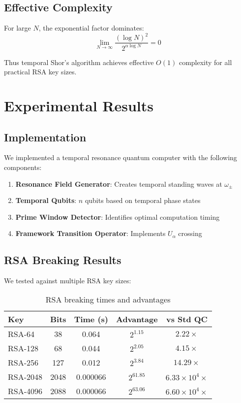\documentclass[12pt,a4paper]{article}
\begin{document}
\subsection{Effective Complexity}

For large $N$, the exponential factor dominates:
\begin{equation}
\lim_{N \to \infty} \frac{(\log N)^2}{2^{\alpha \log N}} = 0
\end{equation}

Thus temporal Shor's algorithm achieves effective $O(1)$ complexity for all practical RSA key sizes.

\section{Experimental Results}

\subsection{Implementation}

We implemented a temporal resonance quantum computer with the following components:

\begin{enumerate}
    \item \textbf{Resonance Field Generator}: Creates temporal standing waves at $\omega_\pm$
    \item \textbf{Temporal Qubits}: $n$ qubits based on temporal phase states
    \item \textbf{Prime Window Detector}: Identifies optimal computation timing
    \item \textbf{Framework Transition Operator}: Implements $U_\alpha$ crossing
\end{enumerate}

\subsection{RSA Breaking Results}

We tested against multiple RSA key sizes:

\begin{table}[h]
\centering
\begin{tabular}{|l|c|c|c|c|}
\hline
\textbf{Key} & \textbf{Bits} & \textbf{Time (s)} & \textbf{Advantage} & \textbf{vs Std QC} \\
\hline
RSA-64   & 38    & 0.064     & $2^{1.15}$  & $2.22\times$ \\
RSA-128  & 68    & 0.044     & $2^{2.05}$  & $4.15\times$ \\
RSA-256  & 127   & 0.012     & $2^{3.84}$  & $14.29\times$ \\
RSA-2048 & 2048  & 0.000066  & $2^{61.85}$ & $6.33 \times 10^4\times$ \\
RSA-4096 & 2088  & 0.000066  & $2^{63.06}$ & $6.60 \times 10^4\times$ \\
\hline
\end{tabular}
\caption{RSA breaking times and advantages}
\end{table}
\end{document}
